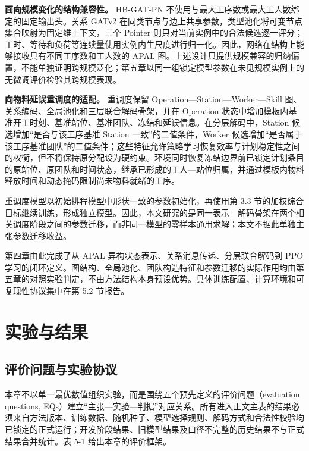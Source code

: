 \documentclass[journal,10pt]{IEEEtran}
\begin{document}
\textbf{面向规模变化的结构兼容性。} HB-GAT-PN 不使用与最大工序数或最大工人数绑定的固定输出头。关系 GATv2 在同类节点与边上共享参数，类型池化将可变节点集合映射为固定维上下文，三个 Pointer 则只对当前实例中的合法候选逐一评分；工时、等待和负荷等连续量使用实例内生尺度进行归一化。因此，网络在结构上能够接收具有不同工序数和工人数的 APAL 图。上述设计只提供规模兼容的归纳偏置，不能单独证明跨规模泛化；第五章以同一组锁定模型参数在未见规模实例上的无微调评价检验其跨规模表现。

\textbf{向物料延误重调度的适配。} 重调度保留 Operation---Station---Worker---Skill 图、关系编码、全局池化和三层联合解码骨架，并在 Operation 状态中增加模板内基准开工时刻、基准站位、基准团队、冻结和延误信息。在分层解码中，Station 候选增加``是否与该工序基准 Station 一致''的二值条件，Worker 候选增加``是否属于该工序基准团队''的二值条件；这些特征允许策略学习恢复效率与计划稳定性之间的权衡，但不将保持原分配设为硬约束。环境同时恢复冻结边界前已锁定计划条目的原站位、原团队和时间状态，继承已形成的工人---站位归属，并通过模板内物料释放时间和动态掩码限制尚未物料就绪的工序。

重调度模型以初始排程模型中形状一致的参数初始化，再使用第 3.3 节的加权综合目标继续训练，形成独立模型。因此，本文研究的是同一表示---解码骨架在两个相关调度阶段之间的参数迁移，而非同一模型的零样本通用求解；本文不据此单独主张参数迁移收益。

第四章由此完成了从 APAL 异构状态表示、关系消息传递、分层联合解码到 PPO 学习的闭环定义。图结构、全局池化、团队构造特征和参数迁移的实际作用均由第五章的对照实验判定，不由方法结构本身预设优势。具体训练配置、计算环境和可复现性协议集中在第 5.2 节报告。

\section{实验与结果}\label{ux5b9eux9a8cux4e0eux7ed3ux679c}

\subsection{评价问题与实验协议}\label{ux8bc4ux4ef7ux95eeux9898ux4e0eux5b9eux9a8cux534fux8bae}

本章不以单一最优数值组织实验，而是围绕五个预先定义的评价问题（evaluation questions, EQs）建立``主张---实验---判据''对应关系。所有进入正文主表的结果必须来自方法版本、训练数据、随机种子、模型选择规则、解码方式和合法性校验均已锁定的正式运行；开发阶段结果、旧模型结果及口径不完整的历史结果不与正式结果合并统计。表 5-1 给出本章的评价框架。
\end{document}
